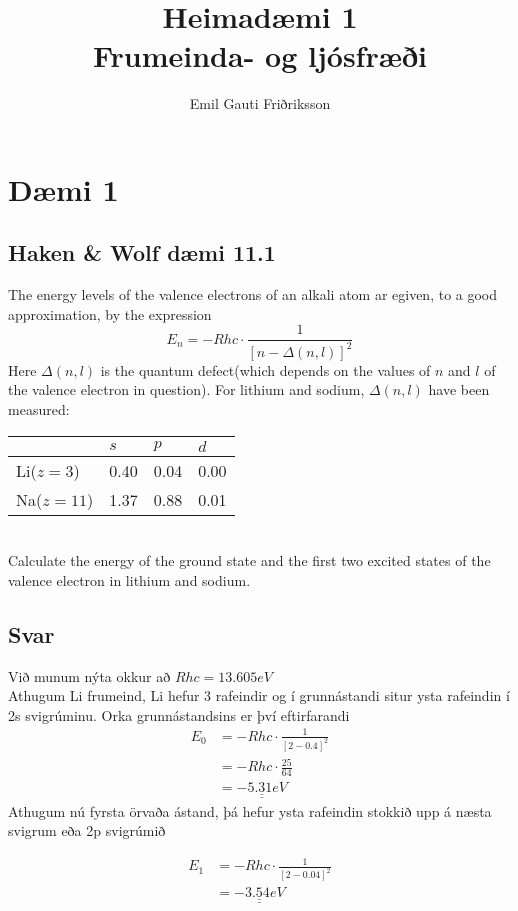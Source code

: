 \documentclass[11pt]{article}
\title{Heimadæmi 1\\ \vspace{0.4cm} \large Frumeinda- og ljósfræði}
\author{Emil Gauti Friðriksson}
\begin{document}
\maketitle
\section*{Dæmi 1}

\subsection*{Haken \& Wolf dæmi 11.1}
The energy levels of the valence electrons of an alkali atom ar egiven, to a good approximation, by the expression
$$E_n  =- Rhc\cdot\frac{1}{[n-\Delta(n,l)]^2}$$
\noindent Here $\Delta (n,l)$ is the quantum defect(which depends on the values of $n$ and $l$ of the valence electron in question). For lithium and sodium, $\Delta(n,l)$ have been measured:\\

\begin{tabular}{ l l l l }
\hline
\quad 		& $s$ & $p$ & $d$\\
\hline
Li($z=3$)  	& 0.40 & 0.04 & 0.00\\
Na($z=11$) 	& 1.37& 0.88 & 0.01\\
\hline
\end{tabular}\\

\noindent Calculate the energy of the ground state and the first two excited states of the valence electron in lithium and sodium.\\

\subsection*{Svar}
Við munum nýta okkur að $Rhc=13.605 eV$\\
Athugum Li frumeind, Li hefur 3 rafeindir og í grunnástandi situr ysta rafeindin í 2s svigrúminu. Orka grunnástandsins er því eftirfarandi
\begin{align*}
E_0  	&= -Rhc\cdot\frac{1}{[2-0.4]^2}\\
		&= -Rhc\cdot \frac{25}{64}\\
        &= \underline{\underline{-5.31 eV}}
\end{align*}
Athugum nú fyrsta örvaða ástand, þá hefur ysta rafeindin stokkið upp á næsta svigrum eða 2p svigrúmið

\begin{align*}
E_1 &= -Rhc\cdot\frac{1}{[2-0.04]^2}\\
	&= \underline{\underline{-3.54 eV}}
\end{align*}
\end{document}
